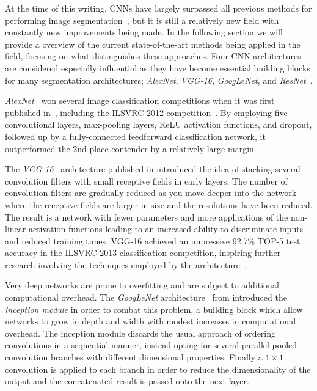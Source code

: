 At the time of this writing, CNNs have largely surpassed all previous methods for performing image segmentation~\cite{segmentation-overview}, but it is still a relatively new field with constantly new improvements being made.
In the following section we will provide a overview of the current state-of-the-art methods being applied in the field, focusing on what distinguishes these approaches.
Four CNN architectures are considered especially influential as they have become essential building blocks for many segmentation architectures; \textit{AlexNet}, \textit{VGG-16}, \textit{GoogLeNet}, and \textit{ResNet}~\cite{segmentation-overview}.

\textit{AlexNet}~\cite{segmentation-alexnet} won several image classification competitions when it was first published in~\citeyear{segmentation-alexnet}, including the ILSVRC-2012 competition~\cite{segmentation-overview}.
By employing five convolutional layers, max-pooling layers, ReLU activation functions, and dropout, followed up by a fully-connected feedforward classification network, it outperformed the 2nd place contender by a relatively large margin.

The \textit{VGG-16}~\cite{vgg-16} architecture published in \citeyear{vgg-16} introduced the idea of stacking several convolution filters with small receptive fields in early layers.
The number of convolution filters are gradually reduced as you move deeper into the network where the receptive fields are larger in size and the resolutions have been reduced.
The result is a network with fewer parameters and more applications of the non-linear activation functions leading to an increased ability to discriminate inputs and reduced training times.
VGG-16 achieved an impressive 92.7\% TOP-5 test accuracy in the ILSVRC-2013 classification competition, inspiring further research involving the techniques employed by the architecture~\cite{segmentation-overview}.

Very deep networks are prone to overfitting and are subject to additional computational overhead.
The \textit{GoogLeNet} architecture~\cite{googlenet} from \citeyear{googlenet} introduced the \textit{inception module} in order to combat this problem, a building block which allow networks to grow in depth and width with modest increases in computational overhead.
The inception module discards the usual approach of ordering convolutions in a sequential manner, instead opting for several parallel pooled convolution branches with different dimensional properties.
Finally a $1 \times 1$ convolution is applied to each branch in order to reduce the dimensionality of the output and the concatenated result is passed onto the next layer.

